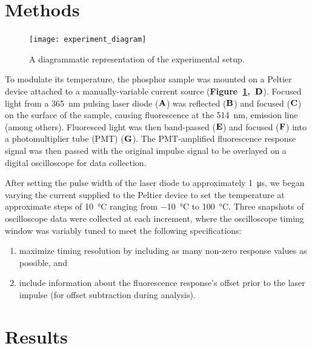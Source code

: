 \documentclass[12pt]{report}
\begin{document}
  \section*{Methods}{

  \begin{figure}[h]
    \centering
    \texttt{[image: experiment\_diagram]}
    \caption{A diagrammatic representation of the experimental setup.}\label{fig:setup}
  \end{figure}

    To modulate its temperature, the phosphor sample was mounted on a Peltier device attached to a manually-variable current source (\textbf{Figure~\ref*{fig:setup},~\(\bf{D}\)}). Focused light from a \SI{365}{\nano \meter} pulsing laser diode (\(\bf{A}\)) was reflected (\(\bf{B}\)) and focused (\(\bf{C}\)) on the surface of the sample, causing fluorescence at the \SI{514}{\nm},  emission line (among others). Fluoresced light was then band-passed (\(\bf{E}\)) and focused (\(\bf{F}\)) into a photomultiplier tube (PMT) (\(\bf{G}\)). The PMT-amplified fluorescence response signal was then passed with the original impulse signal to be overlayed on a digital oscilloscope for data collection.
    
    After setting the pulse width of the laser diode to approximately \SI{1}{\micro\second}, we began varying the current supplied to the Peltier device to set the temperature at approximate steps of \SI{10}{\degreeCelsius} ranging from \SI{-10}{\degreeCelsius} to \SI{100}{\degreeCelsius}. Three snapshots of oscilloscope data were collected at each increment, where the oscilloscope timing window was variably tuned to meet the following specifications:
      
      \begin{enumerate}
        \item maximize timing resolution by including as many non-zero response values as possible, and
        \item include information about the fluorescence response's offset prior to the laser impulse (for offset subtraction during analysis).
      \end{enumerate}
  }

  \section*{Results}
\end{document}
